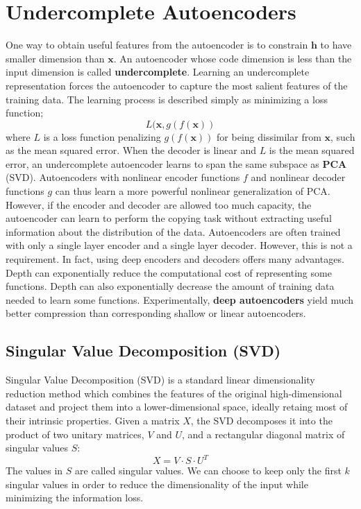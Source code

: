 \section{Undercomplete Autoencoders}
One way to obtain useful features from the autoencoder is to constrain $\textbf{h}$ to have smaller dimension than $\textbf{x}$. An autoencoder whose code dimension is less than the input dimension is called \textbf{undercomplete}. Learning an undercomplete representation forces the autoencoder to capture the most salient features of the training data.\newline\newline
The learning process is described simply as minimizing a loss function;
\[L(\textbf{x}, g(f(\textbf{x}))\]
where $L$ is a loss function penalizing $g(f(\textbf{x}))$ for being dissimilar from $\textbf{x}$, such as the mean squared error.\newline\newline
When the decoder is linear and $L$ is the mean squared error, an undercomplete autoencoder learns to span the same subspace as \textbf{PCA} (SVD). Autoencoders with nonlinear encoder functions $f$ and nonlinear decoder functions $g$ can thus learn a more powerful nonlinear generalization of PCA. However, if the encoder and decoder are allowed too much capacity, the autoencoder can learn to perform the copying task without extracting useful information about the distribution of the data.\newline\newline
Autoencoders are often trained with only a single layer encoder and a single layer
decoder. However, this is not a requirement. In fact, using deep encoders and
decoders offers many advantages. Depth can exponentially reduce the computational cost of representing some functions. Depth can also exponentially decrease the amount of training data needed to learn some functions. Experimentally, \textbf{deep autoencoders} yield much better compression than corresponding shallow or linear autoencoders.

\subsection{Singular Value Decomposition (SVD)}
Singular Value Decomposition (SVD) is a standard linear dimensionality reduction method which combines the features of the original high-dimensional dataset and project them into a lower-dimensional space, ideally retaing most of their intrinsic properties.\newline\newline
Given a matrix $X$, the SVD decomposes it into the product of two unitary matrices, $V$ and $U$, and a rectangular diagonal matrix of singular values $S$:
\[X=V \cdot S \cdot U^T\]
The values in $S$ are called singular values. We can choose to keep only the first $k$ singular values in order to reduce the dimensionality of the input while minimizing the information loss.

